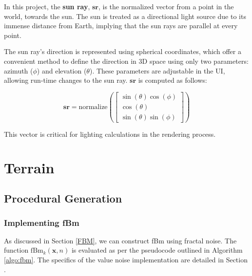 In this project, the \textbf{sun ray}, $\mathbf{sr}$, is the normalized vector from a point in the world, towards the sun. The sun is treated as a directional light source due to its immense distance from Earth, implying that the sun rays are parallel at every point.

The sun ray's direction is represented using spherical coordinates, which offer a convenient method to define the direction in 3D space using only two parameters: azimuth ($\phi$) and elevation ($\theta$). These parameters are adjustable in the UI, allowing run-time changes to the sun ray. $\mathbf{sr}$ is computed as follows:

\begin{equation}
    \mathbf{sr} = \text{normalize}\left( \begin{bmatrix} \sin(\theta) \cos(\phi) \\ \cos(\theta) \\ \sin(\theta) \sin(\phi) \end{bmatrix} \right)
\end{equation}

This vector is critical for lighting calculations in the rendering process.


\section{Terrain}
\label{Terrain}

\subsection{Procedural Generation}
\label{Terrain Procedural Generation}

\subsubsection{Implementing fBm}
\label{Implement fbm}

As discussed in Section \ref{FBM}, we can construct fBm using fractal noise. The function $\text{fBm}_k(\mathbf{x}, n)$ is evaluated as per the pseudocode outlined in Algorithm \ref{algo:fbm}. The specifics of the value noise implementation are detailed in Section .


